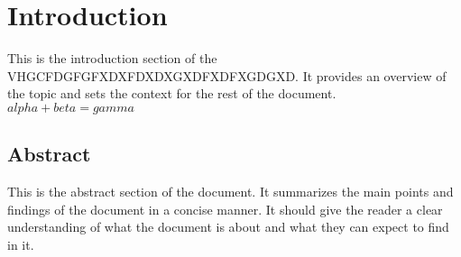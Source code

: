\documentclass[UTF8]{ctexart}
\begin{document}
\section*{Introduction}
This is the introduction section of the VHGCFDGFGFXDXFDXDXGXDFXDFXGDGXD. It provides an overview of the topic and sets the context for the rest of the document.\\
$alpha + beta = gamma$
\subsection*{Abstract}
This is the abstract section of the document. It summarizes the main points and findings of the document in a concise manner. It should give the reader a clear understanding of what the document is about and what they can expect to find in it.
\end{document}
